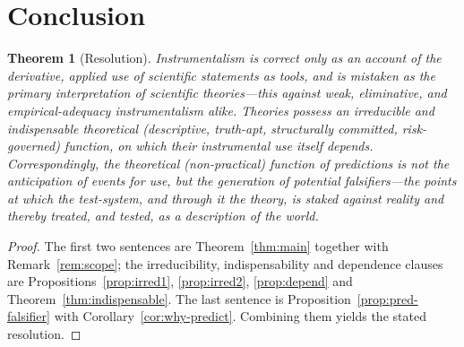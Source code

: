 \documentclass{amsart}
\theoremstyle{definition}
\theoremstyle{plain}
\newtheorem{theorem}{Theorem}
\begin{document}
\section{Conclusion}

\begin{theorem}[Resolution]\label{thm:resolution}
Instrumentalism is correct only as an account of the derivative, \emph{applied}
use of scientific statements as tools, and is \emph{mistaken} as the
\emph{primary} interpretation of scientific theories---this against weak,
eliminative, and empirical-adequacy instrumentalism alike. Theories possess an
irreducible and indispensable theoretical (descriptive, truth-apt, structurally
committed, risk-governed) function, on which their instrumental use itself
depends. Correspondingly, the theoretical (non-practical) function of
predictions is not the anticipation of events for use, but the generation of
potential falsifiers---the points at which the test-system, and through it the
theory, is staked against reality and thereby treated, and tested, as a
description of the world.
\end{theorem}

\begin{proof}
The first two sentences are Theorem~\ref{thm:main} together with
Remark~\ref{rem:scope}; the irreducibility, indispensability and dependence
clauses are Propositions~\ref{prop:irred1}, \ref{prop:irred2},
\ref{prop:depend} and Theorem~\ref{thm:indispensable}. The last sentence is
Proposition~\ref{prop:pred-falsifier} with Corollary~\ref{cor:why-predict}.
Combining them yields the stated resolution.
\end{proof}
\end{document}
